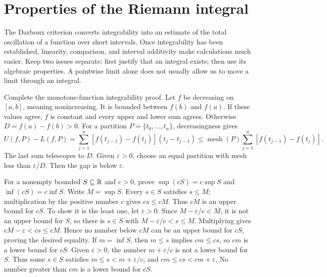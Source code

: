 \section{Properties of the Riemann integral}
The Darboux criterion converts integrability into an estimate of the total
oscillation of a function over short intervals. Once integrability has been
established, linearity, comparison, and interval additivity make calculations
much easier. Keep two issues separate: first justify that an integral exists;
then use its algebraic properties. A pointwise limit alone does not usually
allow us to move a limit through an integral.

\goal Complete the monotone-function integrability proof.
Let $f$ be decreasing on $[a,b]$, meaning nonincreasing. It is bounded
between $f(b)$ and $f(a)$. If these values agree, $f$ is constant and every
upper and lower sum agrees. Otherwise $D=f(a)-f(b)>0$.
For a partition $P=\{t_0,\ldots,t_n\}$, decreasingness gives
\[
 U(f,P)-L(f,P)
 =\sum_{j=1}^n [f(t_{j-1})-f(t_j)](t_j-t_{j-1})
 \le\operatorname{mesh}(P)\sum_{j=1}^n[f(t_{j-1})-f(t_j)].
\]
The last sum telescopes to $D$. Given $\varepsilon>0$, choose an equal
partition with mesh less than $\varepsilon/D$. Then the gap is below
$\varepsilon$.

\goal For a nonempty bounded $S\subseteq\mathbb{R}$ and $c>0$, prove
$\sup(cS)=c\sup S$ and $\inf(cS)=c\inf S$.
Write $M=\sup S$. Every $s\in S$ satisfies $s\le M$;
multiplication by the positive number $c$ gives $cs\le cM$.
Thus $cM$ is an upper bound for $cS$. To show it is the least one,
let $\varepsilon>0$. Since $M-\varepsilon/c<M$, it is not an upper
bound for $S$, so there is $s\in S$ with
$M-\varepsilon/c<s\le M$. Multiplying gives
$cM-\varepsilon<cs\le cM$. Hence no number below $cM$ can be an
upper bound for $cS$, proving the desired equality.
If $m=\inf S$, then $m\le s$ implies $cm\le cs$, so $cm$ is a
lower bound for $cS$. Given $\varepsilon>0$, the number
$m+\varepsilon/c$ is not a lower bound for $S$. Thus some $s\in S$
satisfies $m\le s<m+\varepsilon/c$, and
$cm\le cs<cm+\varepsilon$. No number greater than $cm$ is a lower
bound for $cS$.

